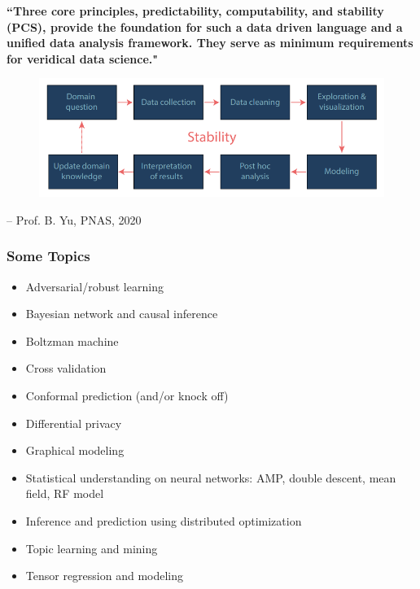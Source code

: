 \documentclass[10pt]{beamer}
\begin{document}
\begin{frame}
\begin{spacing}{1.25}
\begin{center}
{\color{blue}   \bf ``Three core principles, {\color{magenta} predictability, computability,
and stability (PCS)}, provide the foundation for such a data driven language and a unified data analysis framework. They serve as minimum requirements for veridical data science."\\
\vspace{0.5cm}

\begin{figure}[h]
\centering
\includegraphics[scale=0.45]{z3.png}
\end{figure}

-- Prof. B. Yu, PNAS, 2020} 
\end{center} 
\end{spacing}
\end{frame}



\begin{frame}
\frametitle{Some Topics}
\begin{spacing}{1.25}  
\begin{itemize}
\small
\item Adversarial/robust learning
\item Bayesian network and causal inference
\item Boltzman machine
\item Cross validation
\item Conformal prediction (and/or knock off)
\item Differential privacy
\item Graphical modeling
\item Statistical understanding on neural networks: AMP, double descent, mean field, RF model
\item Inference and prediction using distributed optimization
\item Topic learning and mining
\item Tensor regression and modeling
\end{itemize}
\end{spacing}
\end{frame}
 
\end{document}
